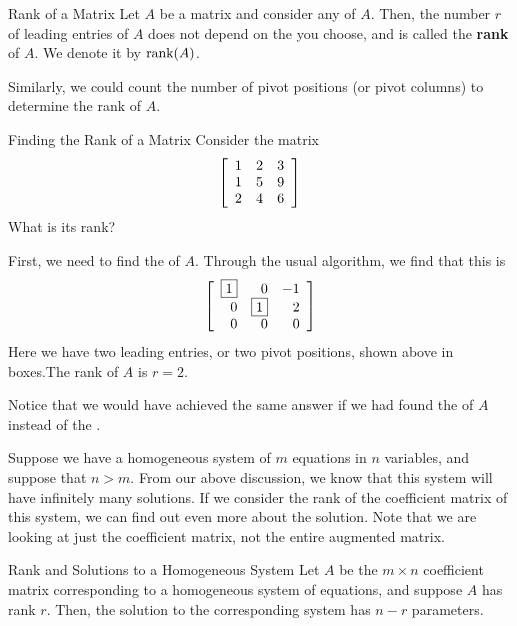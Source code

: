 \begin{definition}{Rank of a Matrix}\label{def:rank}
Let $A$ be a matrix and consider any \ef \;of $A$.
Then, the number $r$ of leading entries of $A$ does not depend on the \ef \;you choose, and is called the \textbf{rank}  of $A$. We denote it by $\mbox{rank}(A)$.
\end{definition}

Similarly, we could count the number of pivot positions (or pivot columns)
to determine the rank of $A$. 

\begin{example}{Finding the Rank of a Matrix}\label{exa:rankofamatrix}
Consider the matrix
\begin{equation*}
\left[
\begin{array}{rrr}
1 & 2 & 3 \\
1 & 5 & 9 \\
2 & 4 & 6 
\end{array}
\right]
\end{equation*}
What is its rank?
\end{example}

\begin{solution}
First, we need to find the \rref \;of $A$. Through the usual algorithm, we find that this is
\begin{equation*}
\left[
\begin{array}{rrr}
\fbox{1} & 0 & -1 \\
0 & \fbox{1} & 2 \\
0 & 0 & 0
\end{array}
\right]
\end{equation*}
Here we have two leading entries, or two pivot positions, shown above in boxes.The rank of $A$ is $r = 2.$
\end{solution}

Notice that we would have achieved the same answer if we had found the \ef \;of $A$ instead of the \rref. 

Suppose we have a homogeneous system of $m$ equations in $n$ variables, and suppose that
$n > m$. From our above discussion, we know that this system will have infinitely many solutions. If we consider the rank of the coefficient
 matrix of this system, we can find out even more about the solution. Note that we are looking at just the coefficient matrix, not the entire
augmented matrix. 

\begin{theorem}{Rank and Solutions to a Homogeneous System}\label{thm:rankhomogeneoussolutions}
Let $A$ be the $m \times n$ coefficient matrix corresponding to a homogeneous system of equations, and suppose $A$ has rank $r$. 
Then, the solution to the corresponding system has $n-r$ parameters. 
\end{theorem}

